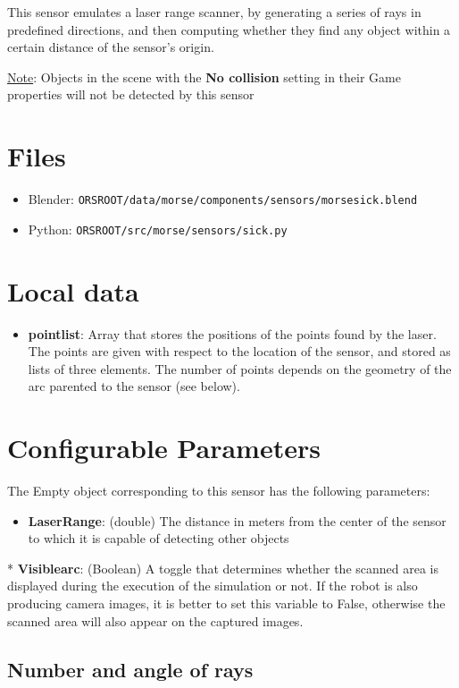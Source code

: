 \documentclass[twoside,a4paper,10pt]{report}
\newcommand{\dokutitleleveltwo}[1]{\section{#1}}
\newcommand{\dokutitleleveltree}[1]{\subsection{#1}}
\newcommand{\dokubold}[1]{\textbf{#1}}
\newcommand{\dokumonospace}[1]{\texttt{#1}}
\newcommand{\dokuunderline}[1]{\underline{#1}}
\newcommand{\dokuitem}{\item}
\begin{document}
This sensor emulates a laser range scanner, by generating a series of rays in predefined directions, and then computing whether they find any object within a certain distance of the sensor's origin.

\dokuunderline{Note}: Objects in the scene with the \dokubold{No collision} setting in their Game properties will not be detected by this sensor


\dokutitleleveltwo{Files}
\label{45b963397aa40d4a0063e0d85e4fe7a1}%

\begin{itemize}
\dokuitem  Blender: \dokumonospace{{\textdollar}ORS{\textunderscore}ROOT/data/morse/components/sensors/morse{\textunderscore}sick.blend}
\dokuitem  Python: \dokumonospace{{\textdollar}ORS{\textunderscore}ROOT/src/morse/sensors/sick.py}
\end{itemize}

\dokutitleleveltwo{Local data}
\label{a53af9dae307d714362321cf5d55d89c}%

\begin{itemize}
\dokuitem  \dokubold{point{\textunderscore}list}: Array that stores the positions of the points found by the laser. The points are given with respect to the location of the sensor, and stored as lists of three elements. The number of points depends on the geometry of the arc parented to the sensor (see below).
\end{itemize}

\dokutitleleveltwo{Configurable Parameters}
\label{576be46e2988ecd45f7341398c2cb015}%

The Empty object corresponding to this sensor has the following parameters:


\begin{itemize}
\dokuitem  \dokubold{Laser{\textunderscore}Range}: (double) The distance in meters from the center of the sensor to which it is capable of detecting other objects
\end{itemize}

  * \dokubold{Visible{\textunderscore}arc}: (Boolean) A toggle that determines whether the scanned area is displayed during the execution of the simulation or not. If the robot is also producing camera images, it is better to set this variable to False, otherwise the scanned area will also appear on the captured images.


\dokutitleleveltree{Number and angle of rays}
\label{0e26d09474e479fcb039d350438a39b6}%
\end{document}

